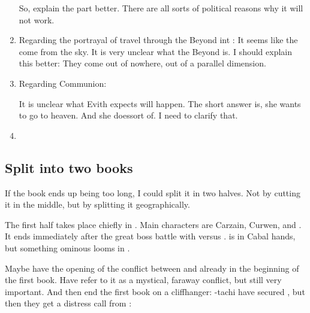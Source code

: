 \begin{enumerate}
    So, explain the  part better.
    There are all sorts of political reasons why it will not work.
  \item 
    Regarding the portrayal of travel through the Beyond int :
    It seems like the \resphain come from the sky. 
    It is very unclear what the Beyond is.
    I should explain this better: 
    They come out of nowhere, out of a parallel dimension. 
  \item 
    Regarding Communion: 
    
    It is unclear what Evith expects will happen.
    The short answer is, she wants to go to heaven.
    And she does\prikker sort of.
    I need to clarify that.
  \item 
\end{enumerate}










\subsection{Split into two books}
If the book ends up being too long, I could split it in two halves.
Not by cutting it in the middle, but by splitting it geographically.

The first half takes place chiefly in \Forclin.
Main characters are Carzain, Curwen, \Achsah and \Takestsha.
It ends immediately after the great boss battle with \Achsah versus \Nzessuacrith.
\Forclin is in Cabal hands, but something ominous looms in \Malcur. 

Maybe have the opening of the conflict between \Teshrial and \Ishnaruchaefir already in the beginning of the first book.
Have \Achsah refer to it as a mystical, faraway conflict, but still very important. 
And then end the first book on a cliffhanger: 
\Achsah-tachi have secured \Forclin, but then they get a distress call from \Malcur:

